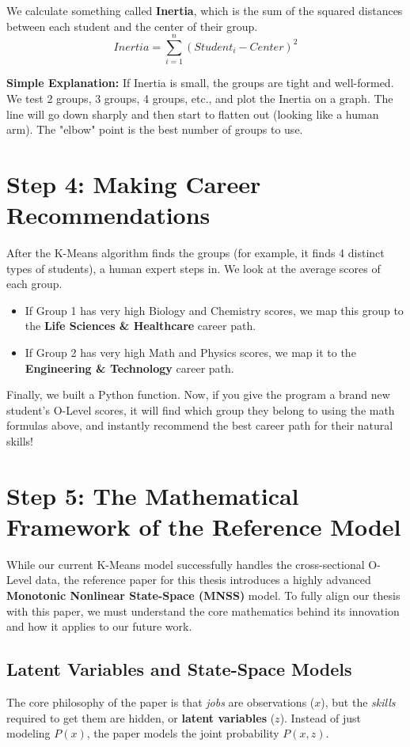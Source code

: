 \documentclass[12pt]{article}
\begin{document}
We calculate something called \textbf{Inertia}, which is the sum of the squared distances between each student and the center of their group. 
\begin{equation}
    Inertia = \sum_{i=1}^{n} (Student_i - Center)^2
\end{equation}

\textbf{Simple Explanation:} If Inertia is small, the groups are tight and well-formed. We test 2 groups, 3 groups, 4 groups, etc., and plot the Inertia on a graph. The line will go down sharply and then start to flatten out (looking like a human arm). The "elbow" point is the best number of groups to use.

\section{Step 4: Making Career Recommendations}
After the K-Means algorithm finds the groups (for example, it finds 4 distinct types of students), a human expert steps in. We look at the average scores of each group.
\begin{itemize}
    \item If Group 1 has very high Biology and Chemistry scores, we map this group to the \textbf{Life Sciences \& Healthcare} career path.
    \item If Group 2 has very high Math and Physics scores, we map it to the \textbf{Engineering \& Technology} career path.
\end{itemize}

Finally, we built a Python function. Now, if you give the program a brand new student's O-Level scores, it will find which group they belong to using the math formulas above, and instantly recommend the best career path for their natural skills!

\section{Step 5: The Mathematical Framework of the Reference Model}
While our current K-Means model successfully handles the cross-sectional O-Level data, the reference paper for this thesis introduces a highly advanced \textbf{Monotonic Nonlinear State-Space (MNSS)} model. To fully align our thesis with this paper, we must understand the core mathematics behind its innovation and how it applies to our future work.

\subsection{Latent Variables and State-Space Models}
The core philosophy of the paper is that \textit{jobs} are observations ($x$), but the \textit{skills} required to get them are hidden, or \textbf{latent variables} ($z$). Instead of just modeling $P(x)$, the paper models the joint probability $P(x, z)$.
\end{document}
